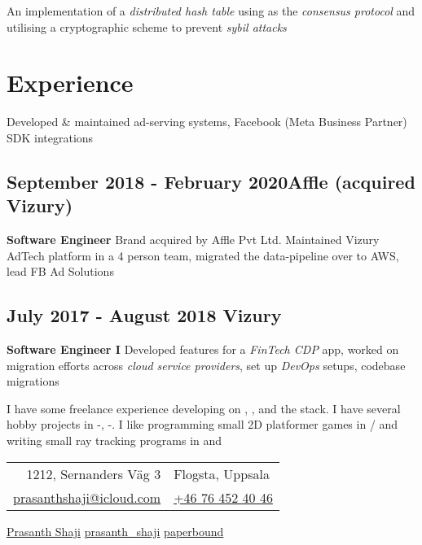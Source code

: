 \documentclass{scrartcl}
\begin{document}
	An implementation of a \textit{distributed hash table} using  as the \textit{consensus protocol} and utilising a cryptographic scheme to prevent \textit{sybil attacks}

	\section{Experience}

	Developed \& maintained ad-serving systems, Facebook (Meta Business Partner) SDK integrations

		\subsection[Affle]{September 2018 - February 2020\hfill Affle (acquired Vizury)}
		\textbf{Software Engineer}
		Brand acquired by Affle Pvt Ltd. Maintained Vizury AdTech platform in a 4 person team, migrated the  data-pipeline over to AWS, lead FB Ad Solutions

		\subsection[Vizury]{July 2017 - August 2018 \hfill Vizury}
		\textbf{Software Engineer I}
		Developed features for a \textit{FinTech CDP} app, worked on migration efforts across \textit{cloud service providers}, set up \textit{DevOps } setups, codebase migrations \newline

	I have some freelance experience developing on , , and the  stack. I have several hobby projects in -, -. I like programming small 2D platformer games in  /  and writing small ray tracking programs in  and 

	\vfill

	\begin{center}
		\begin{tabular}{rl}
			1212, Sernanders Väg 3 & Flogsta, Uppsala \\
			\href{mailto:prasanthshaji@icloud.com}{prasanthshaji@icloud.com} & \href{tel:+46764524046}{+46 76 452 40 46}
		\end{tabular}
	\end{center}

	\begin{center}
		{\color{blue}}
		\href{https://www.linkedin.com/in/prasanth-thomas-shaji/}{Prasanth Shaji}
		{\color{cyan}}
		\href{https://twitter.com/prasanth_shaji}{prasanth\_shaji}
		{\color{black}}
		\href{https://github.com/paperbound}{paperbound}
	\end{center}
\end{document}
